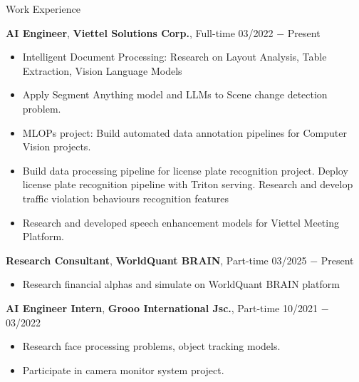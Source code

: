 \documentclass{resume} %
\begin{document}

\begin{rSection}{Work Experience}
\vspace{-1.25em}
\item \textbf{AI Engineer}, \textbf{Viettel Solutions Corp.}, {Full-time} \hfill 03/2022 $-$ Present
\begin{itemize}
    \itemsep -3pt {}
    \item Intelligent Document Processing: Research on Layout Analysis, Table Extraction, Vision Language Models
    \item Apply Segment Anything model and LLMs to Scene change detection problem. 
    \item MLOPs project: Build automated data annotation pipelines for Computer Vision projects.
    \item Build data processing pipeline for license plate recognition project. Deploy license plate recognition pipeline with Triton serving. Research and develop traffic violation behaviours recognition features
    \item Research and developed speech enhancement models for Viettel Meeting Platform.
\end{itemize}
\item \textbf{Research Consultant}, \textbf{WorldQuant BRAIN}, {Part-time} \hfill 03/2025 $-$ Present
\begin{itemize}
    \item Research financial alphas and simulate on WorldQuant BRAIN platform
\end{itemize}
\item \textbf{AI Engineer Intern}, \textbf{Grooo International Jsc.}, {Part-time} \hfill 10/2021 $-$ 03/2022
\begin{itemize}
\item Research face processing problems, object tracking models.
\item Participate in camera monitor system project.
\end{itemize}

\end{rSection}
\end{document}
